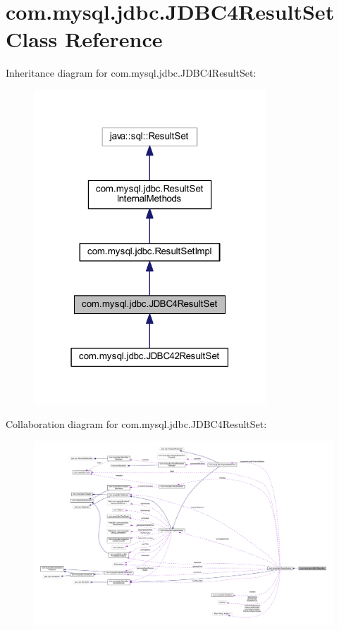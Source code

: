 \hypertarget{classcom_1_1mysql_1_1jdbc_1_1_j_d_b_c4_result_set}{}\section{com.\+mysql.\+jdbc.\+J\+D\+B\+C4\+Result\+Set Class Reference}
\label{classcom_1_1mysql_1_1jdbc_1_1_j_d_b_c4_result_set}


Inheritance diagram for com.\+mysql.\+jdbc.\+J\+D\+B\+C4\+Result\+Set\+:
\nopagebreak
\begin{figure}[H]
\begin{center}
\leavevmode
\includegraphics[width=247pt]{classcom_1_1mysql_1_1jdbc_1_1_j_d_b_c4_result_set__inherit__graph}
\end{center}
\end{figure}


Collaboration diagram for com.\+mysql.\+jdbc.\+J\+D\+B\+C4\+Result\+Set\+:
\nopagebreak
\begin{figure}[H]
\begin{center}
\leavevmode
\includegraphics[width=350pt]{classcom_1_1mysql_1_1jdbc_1_1_j_d_b_c4_result_set__coll__graph}
\end{center}
\end{figure}
